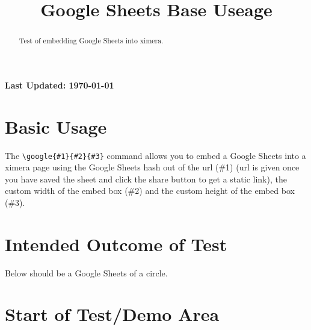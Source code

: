 \documentclass{ximera}
\title{Google Sheets Base Useage}
\begin{document}
\begin{abstract}
    Test of embedding Google Sheets into ximera. 
\end{abstract}
\maketitle

{{\Huge \bfseries Last Updated: \today}} \\


\section{Basic Usage}
The \verb|\google{#1}{#2}{#3}| command allows you to embed a Google Sheets into a ximera page using the Google Sheets hash out of the url (\#1)
(url is given once you have saved the sheet and click the share button to get a static link), 
the custom width of the embed box (\#2) and the custom height of the embed box (\#3).

\section{Intended Outcome of Test}
Below should be a Google Sheets of a circle.

\section{Start of Test/Demo Area}
\expandafter{}

\hrulefill
\end{document}

